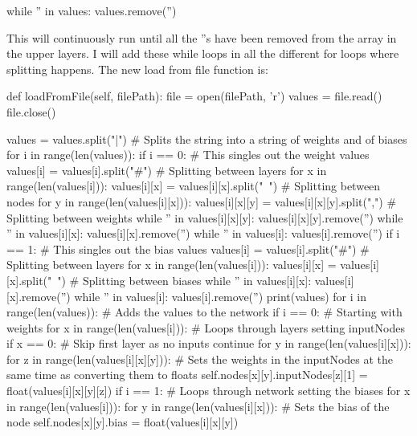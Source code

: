 \documentclass{report}
\begin{document}
\begin{python}
while '' in values:
    values.remove('')
\end{python}
This will continuously run until all the ''s have been removed from the array in the upper layers. I will add these while loops in all the different for loops where splitting happens.
\newpage
\noindent The new load from file function is:
\begin{python}
def loadFromFile(self, filePath):
    file = open(filePath, 'r')
    values = file.read()
    file.close()

    values = values.split("|")  # Splits the string into a string of weights and of biases
    for i in range(len(values)):
        if i == 0:  # This singles out the weight values
            values[i] = values[i].split("#")  # Splitting between layers
            for x in range(len(values[i])):
                values[i][x] = values[i][x].split("~")  # Splitting between nodes
                for y in range(len(values[i][x])):
                    values[i][x][y] = values[i][x][y].split(",")  # Splitting between weights
                    while '' in values[i][x][y]:
                        values[i][x][y].remove('')
                while '' in values[i][x]:
                    values[i][x].remove('')
            while '' in values[i]:
                values[i].remove('')
        if i == 1:  # This singles out the bias values
            values[i] = values[i].split("#")  # Splitting between layers
            for x in range(len(values[i])):
                values[i][x] = values[i][x].split("~")  # Splitting between biases
                while '' in values[i][x]:
                    values[i][x].remove('')
            while '' in values[i]:
                values[i].remove('')
    print(values)
    for i in range(len(values)):  # Adds the values to the network
        if i == 0:  # Starting with weights
            for x in range(len(values[i])):  # Loops through layers setting inputNodes
                if x == 0:  # Skip first layer as no inputs
                    continue
                for y in range(len(values[i][x])):
                    for z in range(len(values[i][x][y])):
                        # Sets the weights in the inputNodes at the same time as converting them to floats
                        self.nodes[x][y].inputNodes[z][1] = float(values[i][x][y][z])
        if i == 1:  # Loops through network setting the biases
            for x in range(len(values[i])):
                for y in range(len(values[i][x])):
                    # Sets the bias of the node
                    self.nodes[x][y].bias = float(values[i][x][y])
\end{python}
\end{document}
